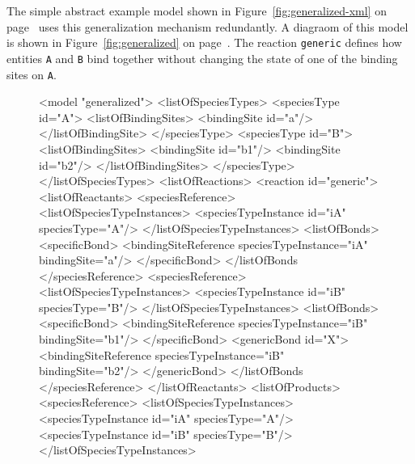 \documentclass{cekarticle}
\begin{document}
The simple abstract example model shown in Figure~\ref{fig:generalized-xml} on
page~\pageref{fig:generalized-xml} uses this generalization mechanism redundantly.
A diagraom of this model is shown in Figure~\ref{fig:generalized} on
page~\pageref{fig:generalized}.
The reaction \texttt{generic} defines how entities \texttt{A} and \texttt{B} bind together without
changing the state of one of the binding sites on \texttt{A}.

\begin{figure}[h]
\begin{example}
<model "generalized">
    <listOfSpeciesTypes>
        <speciesType id="A">
            <listOfBindingSites>
                <bindingSite id="a"/>
            </listOfBindingSite>
        </speciesType>
        <speciesType id="B">
            <listOfBindingSites>
                <bindingSite id="b1"/>
                <bindingSite id="b2"/>
            </listOfBindingSites>
        </speciesType>
    </listOfSpeciesTypes>
    <listOfReactions>
        <reaction id="generic">
            <listOfReactants>
                <speciesReference>
                    <listOfSpeciesTypeInstances>
                        <speciesTypeInstance id="iA" speciesType="A"/>                
                    </listOfSpeciesTypeInstances>
                    <listOfBonds>
                        <specificBond>
                            <bindingSiteReference speciesTypeInstance="iA" bindingSite="a"/>
                        </specificBond>
                    </listOfBonds
            </speciesReference>
                <speciesReference>
                    <listOfSpeciesTypeInstances>
                        <speciesTypeInstance id="iB" speciesType="B"/>                
                    </listOfSpeciesTypeInstances>
                    <listOfBonds>
                        <specificBond>
                            <bindingSiteReference speciesTypeInstance="iB" bindingSite="b1"/>
                        </specificBond>
                        <genericBond id="X">
                            <bindingSiteReference speciesTypeInstance="iB" bindingSite="b2"/>
                        </genericBond>
                    </listOfBonds
            </speciesReference>
            </listOfReactants>
            <listOfProducts>
                <speciesReference>
                    <listOfSpeciesTypeInstances>
                        <speciesTypeInstance id="iA" speciesType="A"/>                
                        <speciesTypeInstance id="iB" speciesType="B"/>                
                    </listOfSpeciesTypeInstances>

\end{example}
\end{figure}
\end{document}
